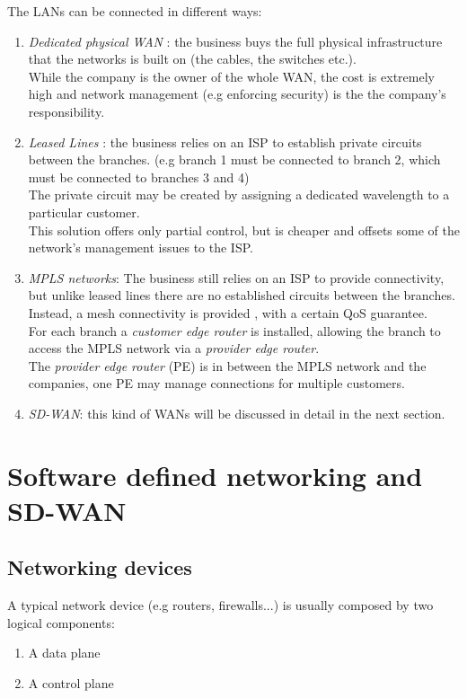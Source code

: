 The LANs can be connected in different ways:
 

\begin{enumerate}
	\item \textit{Dedicated physical WAN} : the business buys the full physical infrastructure that the networks is built on (the cables, the switches etc.). \\ While the company is the owner of the whole WAN, the cost is extremely high and network management (e.g enforcing security) is the the company's responsibility.
	
	\item \textit{Leased Lines} : the business relies on an ISP to establish private circuits between the branches. (e.g branch 1 must be connected to branch 2, which must be connected to branches 3 and 4) \\
	The private circuit may be created by assigning  a dedicated wavelength to a particular customer. \\
	This solution offers only partial control, but is cheaper and offsets some of the network's management issues to the ISP.
	
	\item \textit{MPLS networks}: The business still relies on an ISP to provide connectivity, but unlike leased lines there are no established circuits between the branches.  Instead, a mesh connectivity is provided , with a certain QoS guarantee. \\
	For each branch a \textit{customer edge router} is installed, allowing the branch to access the MPLS network via a \textit{provider edge router}. \\
	The \textit{provider edge router} (PE) is in between the MPLS network and the companies, one PE may manage connections for multiple customers.
	
	\item \textit{SD-WAN}: this kind of WANs will be discussed in detail in the next section.
	
\end{enumerate}

\section{Software defined networking and SD-WAN}

\subsection{Networking devices}
A typical network device (e.g routers, firewalls...) is usually composed by two logical components:
\begin{enumerate}
	\item A data plane 
	\item A control plane
\end{enumerate}

